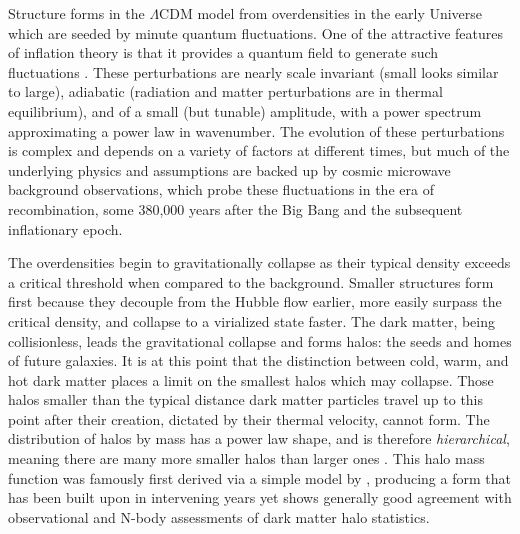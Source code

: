 Structure forms in the $\Lambda$CDM model from overdensities in the early Universe which are seeded by minute quantum fluctuations. One of the attractive features of inflation theory is that it provides a quantum field to generate such fluctuations \parencite{hawking82,guth82,starobinsky82}. These perturbations are nearly scale invariant (small looks similar to large), adiabatic (radiation and matter perturbations are in thermal equilibrium), and of a small (but tunable) amplitude, with a power spectrum approximating a power law in wavenumber. The evolution of these perturbations is complex and depends on a variety of factors at different times, but much of the underlying physics and assumptions are backed up by cosmic microwave background observations, which probe these fluctuations in the era of recombination, some 380,000 years after the Big Bang and the subsequent inflationary epoch.

The overdensities begin to gravitationally collapse as their typical density exceeds a critical threshold when compared to the background. Smaller structures form first because they decouple from the Hubble flow earlier, more easily surpass the critical density, and collapse to a virialized state faster. The dark matter, being collisionless, leads the gravitational collapse and forms halos: the seeds and homes of future galaxies. It is at this point that the distinction between cold, warm, and hot dark matter places a limit on the smallest halos which may collapse. Those halos smaller than the typical distance dark matter particles travel up to this point after their creation, dictated by their thermal velocity, cannot form. The distribution of halos by mass has a power law shape, and is therefore \textit{hierarchical}, meaning there are many more smaller halos than larger ones \parencite{gao04,tinker08}. This halo mass function was famously first derived via a simple model by \textcite{press74}, producing a form that has been built upon in intervening years \parencite{bond91,sheth99,sheth01} yet shows generally good agreement with observational and N-body assessments of dark matter halo statistics.

